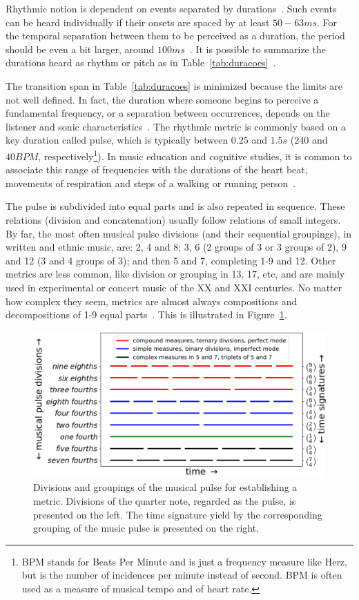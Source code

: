 Rhythmic notion is dependent on events separated by durations~\cite{Lacerda}.
Such events can be heard individually if their onsets are spaced by at least $50-63ms$.
For the temporal separation between them to be perceived as a duration,
the period should be even a bit larger, around $100ms$~\cite{microsound}.
It is possible to summarize the durations heard as rhythm or pitch
as in Table~\ref{tab:duracoes}~\cite{Alfaix, microsound}.

The transition span in Table~\ref{tab:duracoes} is minimized because the limits
are not well defined. In fact, the duration where someone begins to perceive a
fundamental frequency, or a separation between occurrences, depends on the
listener and sonic characteristics~\cite{microsound,Roederer}.
The rhythmic metric is commonly based on a key duration called pulse, which is typically between $0.25$ and $1.5s$ ($240$
and $40 BPM$, respectively\footnote{BPM stands for Beats Per Minute and is just a frequency measure like Herz, but is the number of incidences per minute instead of second. BPM is often used as a measure of musical tempo and of heart rate.}). In music education and cognitive studies, it is common to associate this range of frequencies with the durations of the heart beat, movements of respiration and steps of a walking or running person~\cite{Lacerda,Roederer}.

The pulse is subdivided into equal parts and is also repeated in sequence. These relations (division and concatenation) usually follow relations of small
integers. By far, the most often musical pulse divisions (and their sequential groupings), in written and ethnic
music, are: 2, 4 and 8; 3, 6 (2 groups of 3 or 3 groups of 2), 9 and 12 (3 and 4 groups of 3); and then 5 and 7, completing
1-9 and 12. Other metrics are less common, like division or grouping in 13, 17, etc, and are mainly used in experimental or concert music of the XX and XXI centuries. No matter how complex they seem, metrics are almost always compositions and decompositions of 1-9 equal parts~\cite{Gramani,Roederer}.
This is illustrated in Figure~\ref{fig:pulsoSubAgl}.

\begin{figure}
    \centering
        \includegraphics[width=.9\textwidth]{figures/metricaMusical__}
    \caption{Divisions and groupings of the musical pulse for establishing a metric. Divisions of the quarter note, regarded as the
        pulse, is presented on the left. The time signature yield by the corresponding grouping of the music pulse is presented on the right.}
        \label{fig:pulsoSubAgl}
\end{figure}

